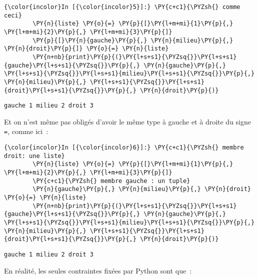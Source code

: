     \begin{Verbatim}[commandchars=\\\{\},frame=single,framerule=0.3mm,rulecolor=\color{cellframecolor}]
{\color{incolor}In [{\color{incolor}5}]:} \PY{c+c1}{\PYZsh{} comme ceci}
        \PY{n}{liste} \PY{o}{=} \PY{p}{[}\PY{l+m+mi}{1}\PY{p}{,} \PY{l+m+mi}{2}\PY{p}{,} \PY{l+m+mi}{3}\PY{p}{]}
        \PY{p}{[}\PY{n}{gauche}\PY{p}{,} \PY{n}{milieu}\PY{p}{,} \PY{n}{droit}\PY{p}{]} \PY{o}{=} \PY{n}{liste}
        \PY{n+nb}{print}\PY{p}{(}\PY{l+s+s1}{\PYZsq{}}\PY{l+s+s1}{gauche}\PY{l+s+s1}{\PYZsq{}}\PY{p}{,} \PY{n}{gauche}\PY{p}{,} \PY{l+s+s1}{\PYZsq{}}\PY{l+s+s1}{milieu}\PY{l+s+s1}{\PYZsq{}}\PY{p}{,} \PY{n}{milieu}\PY{p}{,} \PY{l+s+s1}{\PYZsq{}}\PY{l+s+s1}{droit}\PY{l+s+s1}{\PYZsq{}}\PY{p}{,} \PY{n}{droit}\PY{p}{)}
\end{Verbatim}


    \begin{Verbatim}[commandchars=\\\{\},frame=single,framerule=0.3mm,rulecolor=\color{cellframecolor}]
gauche 1 milieu 2 droit 3
\end{Verbatim}

    Et on n'est même pas obligés d'avoir le même type à gauche et à droite
du signe \texttt{=}, comme ici~:

    \begin{Verbatim}[commandchars=\\\{\},frame=single,framerule=0.3mm,rulecolor=\color{cellframecolor}]
{\color{incolor}In [{\color{incolor}6}]:} \PY{c+c1}{\PYZsh{} membre droit: une liste}
        \PY{n}{liste} \PY{o}{=} \PY{p}{[}\PY{l+m+mi}{1}\PY{p}{,} \PY{l+m+mi}{2}\PY{p}{,} \PY{l+m+mi}{3}\PY{p}{]}
        \PY{c+c1}{\PYZsh{} membre gauche : un tuple}
        \PY{n}{gauche}\PY{p}{,} \PY{n}{milieu}\PY{p}{,} \PY{n}{droit} \PY{o}{=} \PY{n}{liste}
        \PY{n+nb}{print}\PY{p}{(}\PY{l+s+s1}{\PYZsq{}}\PY{l+s+s1}{gauche}\PY{l+s+s1}{\PYZsq{}}\PY{p}{,} \PY{n}{gauche}\PY{p}{,} \PY{l+s+s1}{\PYZsq{}}\PY{l+s+s1}{milieu}\PY{l+s+s1}{\PYZsq{}}\PY{p}{,} \PY{n}{milieu}\PY{p}{,} \PY{l+s+s1}{\PYZsq{}}\PY{l+s+s1}{droit}\PY{l+s+s1}{\PYZsq{}}\PY{p}{,} \PY{n}{droit}\PY{p}{)}
\end{Verbatim}


    \begin{Verbatim}[commandchars=\\\{\},frame=single,framerule=0.3mm,rulecolor=\color{cellframecolor}]
gauche 1 milieu 2 droit 3
\end{Verbatim}

    En réalité, les seules contraintes fixées par Python sont que~:

